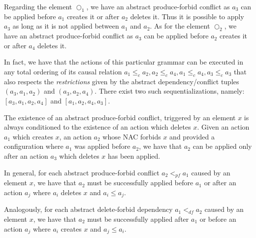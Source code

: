 \begin{example}
  Regarding the element $\Circle_1$, we have an abstract produce-forbid conflict as $a_3$ can be applied before $a_1$ creates it or after $a_2$ deletes it. Thus it is possible to apply $a_3$ as long as it is not applied between $a_1$ and $a_2$. As for the element $\Circle_2$, we have an abstract produce-forbid conflict as $a_3$ can be applied before $a_2$ creates it or after $a_4$ deletes it.

  In fact, we have that the actions of this particular grammar can be executed in any total ordering of its causal relation $a_1 \leq_c a_2, a_2 \leq_c a_4, a_1 \leq_c a_4, a_3 \leq_c a_3$ that also respects the \emph{restrictions} given by the abstract dependency/conflict tuples $(a_3,a_1,a_2)$ and $(a_3,a_2,a_4)$. There exist two such sequentializations, namely: $[a_3, a_1, a_2, a_4]$ and $[a_1,a_2,a_4,a_3]$.
\end{example}

\begin{remark} The existence of an abstract produce-forbid conflict, triggered by an element $x$ is always conditioned to the existence of an action which deletes $x$. Given an action $a_1$ which creates $x$, an action $a_2$ whose NAC forbids $x$ and provided a configuration where $a_1$ was applied before $a_2$, we have that $a_2$ can be applied only after an action $a_3$ which deletes $x$ has been applied.

  In general, for each abstract produce-forbid conflict $a_2 <_{pf} a_1$ caused by an element $x$, we have that $a_2$ must be successfully applied before $a_1$ or after an action $a_{j}$ where $a_i$ deletes $x$ and $a_i \leq a_j$.

  Analogously, for each abstract delete-forbid dependency $a_1 <_{df} a_2$ caused by an element $x$, we have that $a_2$ must be successfully applied after $a_1$ or before an action $a_j$ where $a_i$ creates $x$ and $a_j \leq a_i$.
\end{remark}


